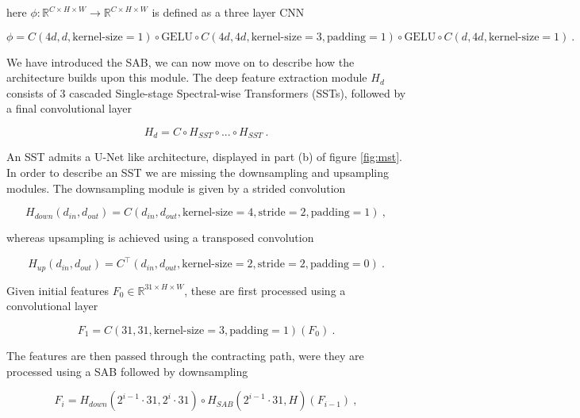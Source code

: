 here $\phi : \mathbb R^{C \times H \times W} \to \mathbb R^{C \times H \times W}$ is defined as a three layer CNN

\begin{equation*}
    \phi = C(4d, d, \text{kernel-size}=1) \circ \text{GELU} \circ C(4d, 4d, \text{kernel-size}=3, \text{padding}=1) \circ \text{GELU} \circ C(d, 4d, \text{kernel-size}=1) ~.
\end{equation*}

We have introduced the SAB, we can now move on to describe how the architecture builds upon this module.
The deep feature extraction module $H_d$ consists of $3$ cascaded Single-stage Spectral-wise Transformers (SSTs),
followed by a final convolutional layer

    $$ H_d = C \circ H_{SST} \circ ... \circ H_{SST} ~. $$

An SST admits a U-Net like architecture, displayed in part (b) of figure \ref{fig:mst}.
In order to describe an SST we are missing the downsampling and upsampling modules.
The downsampling module is given by a strided convolution

    \begin{equation*}
        H_{down}(d_{in}, d_{out}) = C(d_{in}, d_{out}, \text{kernel-size}=4, \text{stride}=2, \text{padding}=1) ~,
    \end{equation*}

whereas upsampling is achieved using a transposed convolution

    \begin{equation*}
        H_{up}(d_{in}, d_{out}) = C^\top(d_{in}, d_{out}, \text{kernel-size}=2, \text{stride}=2, \text{padding}=0) ~.
    \end{equation*}

Given initial features $F_0 \in \mathbb R^{31 \times H \times W}$, 
these are first processed using a convolutional layer

    \begin{equation*}
        F_1 = C(31, 31, \text{kernel-size}=3, \text{padding}=1)(F_0) ~.
    \end{equation*}

The features are then passed through the contracting path,
were they are processed using a SAB followed by downsampling

    \begin{equation*}
        F_i = H_{down}(2^{i-1} \cdot 31, 2^i \cdot 31) \circ H_{SAB}(2^{i-1} \cdot 31, H)(F_{i-1}) ~,
    \end{equation*}

